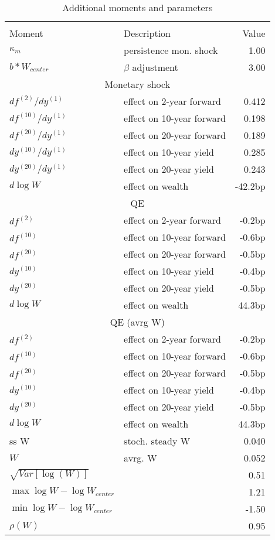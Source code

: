 \begin{table}[htbp]\centering  
 \bgroup  
 \def\arraystretch{1.25}\caption{Additional moments and parameters} 
\begin{tabular}{llr} 
\hline\hline 
\multicolumn{3}{c}{} \\ 
Moment & Description & Value  \\ 
$\kappa_m$ & persistence mon. shock  & 1.00   \\ 
$b*W_{center}$ & $\beta$ adjustment  & 3.00   \\ 
\hline 
\multicolumn{3}{c}{Monetary shock} \\ 
$df^{(2)}/dy^{(1)} $ & effect on 2-year forward  & 0.412 \\ 
$df^{(10)}/dy^{(1)} $ & effect on 10-year forward  & 0.198 \\ 
$df^{(20)}/dy^{(1)} $ & effect on 20-year forward  & 0.189 \\ 
$dy^{(10)}/dy^{(1)} $ & effect on 10-year yield  & 0.285 \\ 
$dy^{(20)}/dy^{(1)} $ & effect on 20-year yield  & 0.243 \\ 
$d\log W$ & effect on wealth  & -42.2bp \\ 
\hline 
\multicolumn{3}{c}{QE} \\ 
$df^{(2)}$ & effect on 2-year forward  & -0.2bp \\ 
$df^{(10)}$ & effect on 10-year forward  & -0.6bp \\ 
$df^{(20)}$ & effect on 20-year forward  & -0.5bp \\ 
$dy^{(10)}$ & effect on 10-year yield  & -0.4bp \\ 
$dy^{(20)}$ & effect on 20-year yield  & -0.5bp \\ 
$d\log W$ & effect on wealth  & 44.3bp \\ 
\hline 
\multicolumn{3}{c}{QE (avrg W)} \\ 
$df^{(2)} $ & effect on 2-year forward  & -0.2bp \\ 
$df^{(10)} $ & effect on 10-year forward  & -0.6bp \\ 
$df^{(20)} $ & effect on 20-year forward  & -0.5bp \\ 
$dy^{(10)} $ & effect on 10-year yield  & -0.4bp \\ 
$dy^{(20)} $ & effect on 20-year yield  & -0.5bp \\ 
$d\log W$ & effect on wealth  & 44.3bp \\ 
\hline 
ss W & stoch. steady W & 0.040   \\ 
$W$ & avrg. W & 0.052   \\ 
$\sqrt{Var[\log(W)]}$ &  & 0.51   \\ 
$\max \log W - \log W_{center} $ &  & 1.21   \\ 
$\min \log W - \log W_{center} $ &  & -1.50   \\ 
$\rho(W)$ &  & 0.95   \\ 
\hline 
\hline\hline 
\end{tabular} 
 \egroup 
\end{table} 
